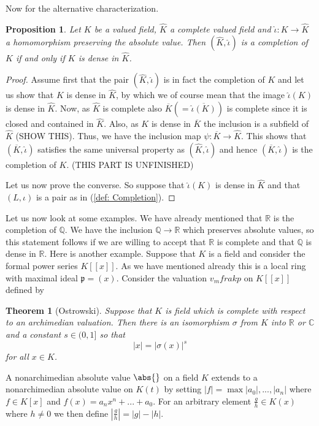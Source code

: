 \documentclass{article}
\newtheorem{theorem}{Theorem}[section]
\newtheorem{proposition}{Proposition}[section]
\newcommand{\mfrak}[1]{\mathfrak{#1}}
\newcommand{\mbb}[1]{\mathbb{#1}}
\begin{document}
Now for the alternative characterization.

\begin{proposition}
    Let $K$ be a valued field, $\hat K$ a complete valued field and $\hat \iota : K \to \hat K$ a homomorphism preserving the absolute value. Then $(\hat K, \hat \iota)$ is a completion of $K$ if and only if $K$ is dense in $\hat K$. 
\end{proposition}
\begin{proof}
    Assume first that the pair $(\hat K, \hat \iota)$ is in fact the completion of $K$ and let us show that $K$ is dense in $\hat K$, by which we of course mean that the image $\hat \iota(K)$ is dense in $\hat K$. Now, as $\hat K$ is complete also $\overline K (= \overline{\hat \iota(K)})$ is complete since it is closed and contained in $\hat K$. Also, as $K$ is dense in $\overline K$ the inclusion  is a subfield of $\hat K$ (SHOW THIS). Thus, we have the inclusion map $\psi : \overline K \to \hat K$. This shows that $(\overline K, \hat \iota)$ satisfies the same universal property as $(\hat K, \hat \iota)$ and hence $(\overline K, \hat \iota)$ is the completion of $K$. (THIS PART IS UNFINISHED)

    Let us now prove the converse. So suppose that $\hat \iota (K)$ is dense in $\hat K$ and that $(L, \iota)$ is a pair as in (\ref{def: Completion}). 
\end{proof}


Let us now look at some examples. We have already mentioned that $\mbb R$ is the completion of $\mbb Q$. We have the inclusion $\mbb Q \rightarrow \mbb R$ which preserves absolute values, so this statement follows if we are willing to accept that $\mbb R$ is complete and that $\mbb Q$ is dense in $\mbb R$. Here is another example. Suppose that $K$ is a field and consider the formal power series $K[[x]]$. As we have mentioned already this is a local ring with maximal ideal $\mfrak p = (x)$. Consider the valuation $v_mfrak{p}$ on $K[[x]]$ defined by

\begin{theorem}[Ostrowski]
    Suppose that $K$ is field which is complete with respect to an archimedian valuation. Then there is an isomorphism $\sigma$ from $K$ into $\mbb R$ or $\mbb C$ and a constant $s \in (0,1]$ so that
    $$|x| = |\sigma(x)|^s$$
    for all $x \in K$.
\end{theorem}



A nonarchimedian absolute value $\abs{}$ on a field $K$ extends to a nonarchimedian absolute value on $K(t)$ by setting $|f| = \max{|a_0|, ..., |a_n|}$ where $f \in K[x]$ and $f(x) = a_nx^n + ... + a_0$. For an arbitrary element $\frac{g}{h} \in K(x)$ where $h \neq 0$ we then define $|\frac{g}{h}| = |g| - |h|$. 
\end{document}
